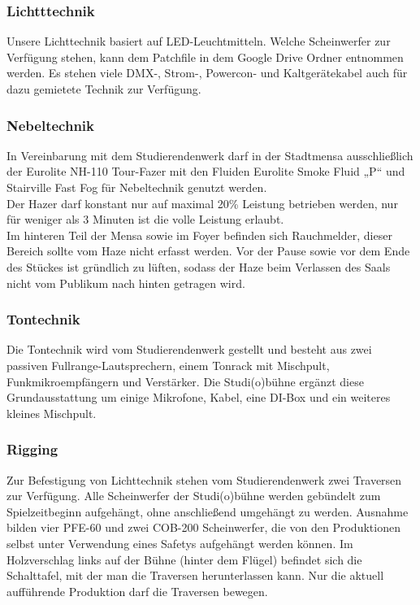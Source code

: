 \subsubsection{Lichtttechnik}
Unsere Lichttechnik basiert auf LED-Leuchtmitteln. Welche Scheinwerfer zur Verfügung stehen, kann dem Patchfile in dem Google Drive Ordner entnommen werden.	
Es stehen viele DMX-, Strom-, Powercon- und Kaltgerätekabel auch für dazu gemietete Technik zur Verfügung.

\subsubsection{Nebeltechnik}
In Vereinbarung mit dem Studierendenwerk darf in der Stadtmensa ausschließlich der Eurolite NH-110 Tour-Fazer mit den Fluiden Eurolite Smoke Fluid „P“ und Stairville Fast Fog für Nebeltechnik genutzt werden.\\
Der Hazer darf konstant nur auf maximal 20\% Leistung betrieben werden, nur für weniger als 3 Minuten ist die volle Leistung erlaubt. \\
Im hinteren Teil der Mensa sowie im Foyer befinden sich Rauchmelder, dieser Bereich sollte vom Haze nicht erfasst werden. Vor der Pause sowie vor dem Ende des Stückes ist gründlich zu lüften, sodass der Haze beim Verlassen des Saals nicht vom Publikum nach hinten getragen wird.	

\subsubsection{Tontechnik}
Die Tontechnik wird vom Studierendenwerk gestellt und besteht aus zwei passiven Fullrange-Lautsprechern, einem Tonrack mit Mischpult, Funkmikroempfängern und Verstärker.	
Die Studi(o)bühne ergänzt diese Grundausstattung um einige Mikrofone, Kabel, eine DI-Box und ein weiteres kleines Mischpult. 

\subsubsection{Rigging}
Zur Befestigung von Lichttechnik stehen vom Studierendenwerk zwei Traversen zur Verfügung. Alle Scheinwerfer der Studi(o)bühne werden gebündelt zum Spielzeitbeginn aufgehängt, ohne anschließend umgehängt zu werden.	
Ausnahme bilden vier PFE-60 und zwei COB-200 Scheinwerfer, die von den Produktionen selbst unter Verwendung eines Safetys aufgehängt werden können.
Im Holzverschlag links auf der Bühne (hinter dem Flügel) befindet sich die Schalttafel, mit der man die Traversen herunterlassen kann. Nur die aktuell aufführende Produktion darf die Traversen bewegen.	

